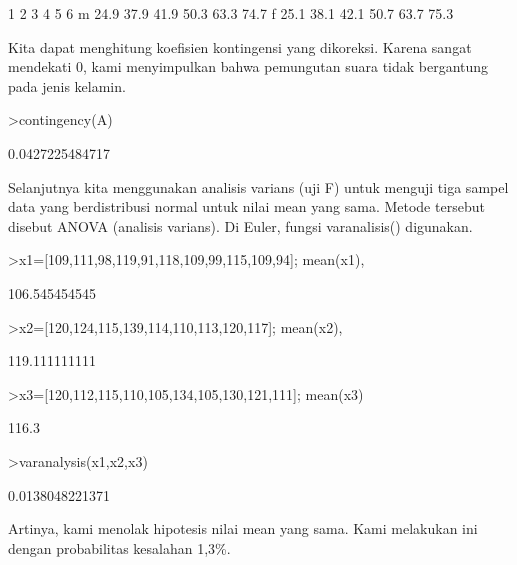 \documentclass[a4paper,10pt]{article}
\begin{document}
\begin{eulernotebook}
\begin{eulercomment}
\begin{eulercomment}
\begin{euleroutput}
             1     2     3     4     5     6
       m  24.9  37.9  41.9  50.3  63.3  74.7
       f  25.1  38.1  42.1  50.7  63.7  75.3
\end{euleroutput}
\begin{eulercomment}
Kita dapat menghitung koefisien kontingensi yang dikoreksi. Karena
sangat mendekati 0, kami menyimpulkan bahwa pemungutan suara tidak
bergantung pada jenis kelamin.
\end{eulercomment}
\begin{eulerprompt}
>contingency(A)
\end{eulerprompt}
\begin{euleroutput}
  0.0427225484717
\end{euleroutput}
\begin{eulercomment}
\begin{eulercomment}
\begin{eulercomment}
Selanjutnya kita menggunakan analisis varians (uji F) untuk menguji
tiga sampel data yang berdistribusi normal untuk nilai mean yang sama.
Metode tersebut disebut ANOVA (analisis varians). Di Euler, fungsi
varanalisis() digunakan.
\end{eulercomment}
\begin{eulerprompt}
>x1=[109,111,98,119,91,118,109,99,115,109,94]; mean(x1),
\end{eulerprompt}
\begin{euleroutput}
  106.545454545
\end{euleroutput}
\begin{eulerprompt}
>x2=[120,124,115,139,114,110,113,120,117]; mean(x2),
\end{eulerprompt}
\begin{euleroutput}
  119.111111111
\end{euleroutput}
\begin{eulerprompt}
>x3=[120,112,115,110,105,134,105,130,121,111]; mean(x3)
\end{eulerprompt}
\begin{euleroutput}
  116.3
\end{euleroutput}
\begin{eulerprompt}
>varanalysis(x1,x2,x3)
\end{eulerprompt}
\begin{euleroutput}
  0.0138048221371
\end{euleroutput}
\begin{eulercomment}
Artinya, kami menolak hipotesis nilai mean yang sama. Kami melakukan
ini dengan probabilitas kesalahan 1,3\%.


\end{eulercomment}
\end{eulercomment}
\end{eulercomment}
\end{eulercomment}
\end{eulercomment}
\end{eulernotebook}
\end{document}
